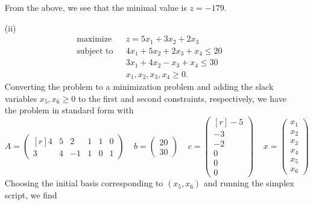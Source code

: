 \documentclass{article}
\begin{document}
\begin{itemize}
\begin{center}
    \end{center}
    From the above, we see that the minimal value is $z = -179$.
    \item[(ii)]
    \begin{align*}
        \text{maximize} \:\:\:\: &z = 5x_1 + 3x_2 + 2x_3\\
        \text{subject to} \:\:\: &4x_1 + 5x_2 + 2x_3 + x_4\leq 20\\
        &3x_1 + 4x_2 - x_3 + x_4 \leq 30\\
        &x_1,x_2,x_3,x_4 \geq 0.
    \end{align*}
    Converting the problem to a minimization problem and adding the slack variables $x_5,x_6 \geq 0$ to the first and second constraints, respectively, we have the problem in standard form with
    \[A = \begin{pmatrix*}[r]
        4 & 5 & 2 & 1 & 1 & 0\\
        3 & 4 & -1 & 1 & 0 & 1
    \end{pmatrix*}
    \:\:\:\:\:
    b = \begin{pmatrix}
        20\\
        30
    \end{pmatrix}
    \:\:\:\:\:
    c = \begin{pmatrix*}[r]
        -5\\
        -3\\
        -2\\
        0\\
        0\\
        0
    \end{pmatrix*}
    \:\:\:\:\:
    x = \begin{pmatrix}
        x_1\\
        x_2\\
        x_3\\
        x_4\\
        x_5\\
        x_6
    \end{pmatrix}
    \]
    Choosing the initial basis corresponding to $(x_5,x_6)$ and running the simplex script, we find
    \begin{center}

\end{center}
\end{itemize}
\end{document}
